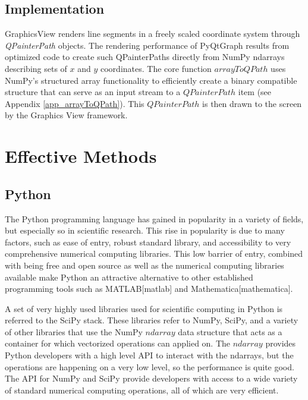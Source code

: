 \documentclass[journal]{vgtc}                %
\begin{document}
\subsection{Implementation}
GraphicsView renders line segments in a freely scaled coordinate system through \emph{QPainterPath} objects. The rendering performance of PyQtGraph results from optimized code to create such QPainterPaths directly from NumPy ndarrays describing sets of $x$ and $y$ coordinates. The core function \emph{$arrayToQPath$} uses NumPy's structured array functionality to efficiently create a binary compatible structure that can serve as an input stream to a $QPainterPath$ item (see Appendix \ref{app_arrayToQPath}). This $QPainterPath$ is then drawn to the screen by the Graphics View framework.


\section{Effective Methods}
\subsection{Python}



The Python programming language has gained in popularity in a variety of fields, but especially so in scientific research.  This rise in popularity is due to many factors, such as ease of entry, robust standard library, and accessibility to very comprehensive numerical computing libraries.  This low barrier of entry, combined with being free and open source as well as the numerical computing libraries available make Python an attractive alternative to other established programming tools such as MATLAB[matlab] and Mathematica[mathematica].  

A set of very highly used libraries used for scientific computing in Python is referred to the SciPy stack.  These libraries refer to NumPy, SciPy, and a variety of other libraries that use the NumPy $ndarray$ data structure that acts as a container for which vectorized operations can applied on.  The $ndarray$ provides Python developers with a high level API to interact with the ndarrays, but the operations are happening on a very low level, so the performance is quite good.  The API for NumPy and SciPy provide developers with access to a wide variety of standard numerical computing operations, all of which are very efficient.
\end{document}
